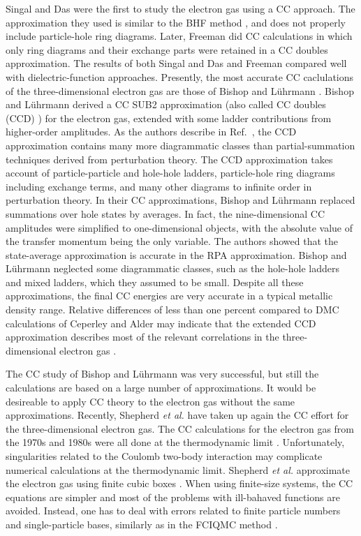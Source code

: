 \documentclass[a4paper,12pt]{report}
\begin{document}
Singal and Das \cite{singal1973} were the first to study 
the electron gas using a CC approach. The approximation
they used is similar to the BHF method \cite{haftel_tabakin}, 
and does not properly include particle-hole ring diagrams.
Later, Freeman did CC calculations \cite{freeman1977} in 
which only ring diagrams and their exchange parts were 
retained in a CC doubles approximation. The results of both
Singal and Das \cite{singal1973} and Freeman 
\cite{freeman1977} compared well with dielectric-function
approaches. Presently, the most accurate CC caclulations of 
the three-dimensional electron gas are those of Bishop and
L{\"u}hrmann \cite{bishop1978,bishop1982}. Bishop and
L{\"u}hrmann derived a CC SUB2 approximation (also called
CC doubles (CCD) \cite{bartlett_book}) for the electron gas, 
extended with some ladder contributions from higher-order
amplitudes. As the authors describe in 
Ref.~\cite{bishop1978}, the CCD approximation 
contains many more diagrammatic classes than
partial-summation techniques derived from perturbation 
theory. The CCD approximation takes account of 
particle-particle and hole-hole ladders, particle-hole
ring diagrams including exchange terms, and many other
diagrams to infinite order in perturbation theory. 
In their CC approximations, Bishop and L{\"u}hrmann 
replaced summations over hole states by averages. In
fact, the nine-dimensional CC amplitudes were simplified
to one-dimensional objects, with the absolute value
of the transfer momentum being the only variable. 
The authors showed that the state-average approximation
is accurate in the RPA approximation.
Bishop and L{\"u}hrmann neglected some diagrammatic 
classes, such as the hole-hole ladders and mixed ladders, 
which they assumed to be small. Despite all these 
approximations, the final CC energies are very accurate 
in a typical metallic density range. Relative 
differences of less than one percent
compared to DMC calculations of Ceperley and Alder
may indicate that the extended CCD approximation describes
most of the relevant correlations in the three-dimensional
electron gas \cite{bishop1982}. 

The CC study of Bishop and L{\"u}hrmann was very successful,
but still the calculations are based on a large number of
approximations. It would be desireable to apply CC theory
to the electron gas without the same approximations. 
Recently, Shepherd \emph{et al.} \cite{shepherd_2012b,
shepherd2013a,shepherd2013b,shepherd2013c} have 
taken up again the CC effort for the three-dimensional 
electron gas. The CC calculations for the electron gas
from the 1970s and 1980s were all done at the 
thermodynamic limit \cite{singal1973,freeman1977,
bishop1978,bishop1982}. Unfortunately, singularities
related to the Coulomb two-body interaction may complicate
numerical calculations at the thermodynamic limit. 
Shepherd \emph{et al.} approximate the electron gas using
finite cubic boxes \cite{shepherd_2012b,
shepherd2013a,shepherd2013b,shepherd2013c}. When using 
finite-size systems, the CC equations are simpler and most 
of the problems with ill-bahaved functions are avoided. 
Instead, one has to deal with errors related to finite 
particle numbers and single-particle bases, similarly as 
in the FCIQMC method \cite{shepherd_2012a,shepherd_2012b,
shepherd_2012c}.
\end{document}
